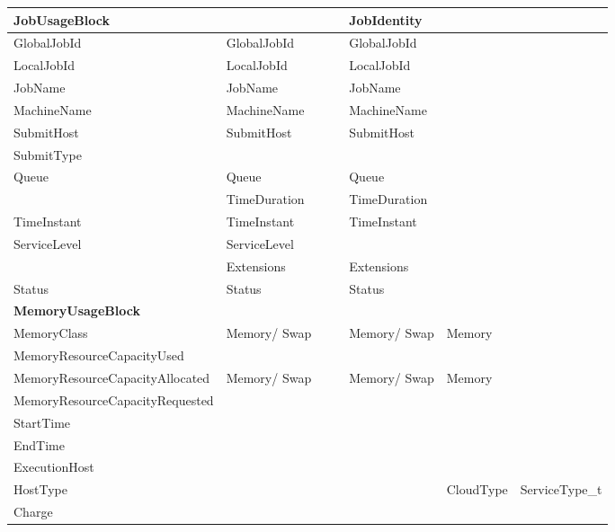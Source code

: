 \begin{longtable}{ | p{} | p{} | p{} | p{} | p{} | p{} | p{} | }
\textbf{Job\-Usage\-Block}& 			& 			&			& \textbf{Job\-Identity}& 						& \\ \hline
GlobalJobId		& GlobalJobId		& 			&			& GlobalJobId		& 						& \\ \hline
LocalJobId		& LocalJobId		& 			&			& LocalJobId		& 						& \\ \hline
JobName			& JobName		& 			&			& JobName		& 						& \\ \hline
Machine\-Name		& Machine\-Name		& 			&			& Machine\-Name		& 						& \\ \hline
SubmitHost		& SubmitHost		& 			&			& SubmitHost		& 						& \\ \hline
SubmitType		& 			& 			&			& 			& 						& \\ \hline
Queue			& Queue			& 			&			& Queue			& 						& \\ \hline
			& Time\-Duration	& 			&			& Time\-Duration	& 						& \\ \hline
TimeInstant		& TimeInstant		& 			&			& TimeInstant		& 						& \\ \hline
ServiceLevel		& ServiceLevel		& 			&			& 			& 						& \\ \hline
			& Extensions		& 			&			& Extensions		& 					& \\
\hline
Status			& Status		& 			&			& Status		& 						& \\ \hline\hline






\textbf{Memory\-Usage\-Block}&			&			&			&			&						& \\ \hline
Memory\-Class		& Memory/ Swap		& 			&			& Memory/ Swap		& Memory					& \\ \hline
Memory\-Resource\-Capacity\-Used& 		&			& 			& 			&						& \\ \hline
Memory\-Resource\-Capacity\-Allocated& Memory/ Swap	& 			&			& Memory/ Swap		& Memory					& \\ \hline
Memory\-Resource\-Capacity\-Requested& 		& 			&			& 			& 						& \\ \hline
StartTime		& 			& 			&			& 			& 						& \\ \hline
EndTime			& 			& 			&			& 			& 						& \\ \hline
ExecutionHost			& 			& 			&			& 			& 						& \\ \hline
HostType		& 			& 			&			& 			& CloudType					& ServiceType\_t\\ \hline
Charge			& 			& 			&			& 			& 						& \\ \hline\hline




\end{longtable}

